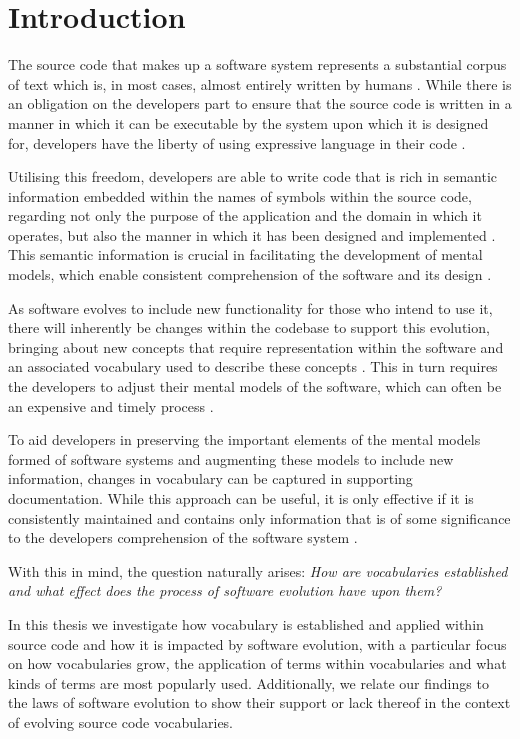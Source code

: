 \chapter{Introduction}
\label{cha:introduction} 


The source code that makes up a software system represents a substantial corpus of text which is, in most cases, almost entirely written by humans \cite{Naur75a}. While there is an obligation on the developers part to ensure that the source code is written in a manner in which it can be executable by the system upon which it is designed for, developers have the liberty of using expressive language in their code \cite{Biggerstaff93a}.

Utilising this freedom, developers are able to write code that is rich in semantic information embedded within the names of symbols within the source code, regarding not only the purpose of the application and the domain in which it operates, but also the manner in which it has been designed and implemented \cite{Jackson06a}. This semantic information is crucial in facilitating the development of mental models, which enable consistent comprehension of the software and its design \cite{Littman87a}.

As software evolves to include new functionality for those who intend to use it, there will inherently be changes within the codebase to support this evolution, bringing about new concepts that require representation within the software and an associated vocabulary used to describe these concepts \cite{Godfrey02a}. This in turn requires the developers to adjust their mental models of the software, which can often be an expensive and timely process \cite{Von02a}.

To aid developers in preserving the important elements of the mental models formed of software systems and augmenting these models to include new information, changes in vocabulary can be captured in supporting documentation. While this approach can be useful, it is only effective if it is consistently maintained and contains only information that is of some significance to the developers comprehension of the software system \cite{Parnas85a}.

With this in mind, the question naturally arises: \emph{How are vocabularies established and what effect does the process of software evolution have upon them?}

In this thesis we investigate how vocabulary is established and applied within source code and how it is impacted by software evolution, with a particular focus on how vocabularies grow, the application of terms within vocabularies and what kinds of terms are most popularly used. Additionally, we relate our findings to the laws of software evolution \cite{Lehman97a} to show their support or lack thereof in the context of evolving source code vocabularies.

